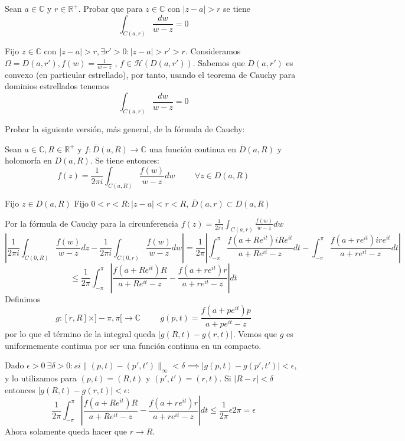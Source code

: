 
\begin{ejer}
	Sean $a\in\mathbb{C}$ y $r\in\mathbb{R}^+$. Probar que para $z\in\mathbb{C}$ con $|z-a|>r$ se tiene
	$$ \int_{C(a,r)} \frac{dw}{w-z} = 0 $$
\end{ejer}
\begin{sol}
Fijo $z\in\mathbb{C}$ con $|z-a|>r, \exists r'>0 : |z-a|>r'>r$.
Consideramos $\Omega = D(a,r'), f(w) = \frac{1}{w-z}$ , $f\in\mathcal{H}(D(a,r'))$. Sabemos que $D(a,r')$ es convexo (en particular estrellado), por tanto, usando el teorema de Cauchy para dominios estrellados tenemos %
$$\int_{C(a,r)} \frac{dw}{w-z} = 0$$
\end{sol}


\begin{ejer}
	Probar la siguiente versión, más general, de la fórmula de Cauchy:
	
	Sean $a\in\mathbb{C},R\in\mathbb{R}^+$ y $f:\overline{D}(a,R) \rightarrow \mathbb{C}$ una función continua en $\overline{D}(a,R)$ y holomorfa en $D(a,R)$. Se tiene entonces:
	$$ f(z) = \frac{1}{2\pi i} \int_{C(a,R)} \frac{f(w)}{w-z}dw \hspace{1cm} \forall z\in D(a,R) $$
\end{ejer}

\begin{sol}

Fijo $z\in D(a,R)$
Fijo $0<r<R : |z-a|<r<R$, $\overline{D}(a,r) \subset D(a,R)$

Por la fórmula de Cauchy para la circunferencia $f(z) = \frac{1}{2\pi i} \int_{C(a,r)} \frac{f(w)}{w-z} dw$
$$ \left|\frac{1}{2\pi i} \int_{C(0,R)} \frac{f(w)}{w-z} dz - \frac{1}{2\pi i} \int_{C(0,r)} \frac{f(w)}{w-z}dw \right| = \frac{1}{2\pi} \left|\int_{-\pi}^{\pi} \frac{f(a+Re^{it}) iRe^{it} }{ a+Re^{it}-z } dt - \int_{-\pi}^{\pi} \frac{f(a+re^{it}) ire^{it}}{a+re^{it}-z} dt\right|$$
$$\leq \frac{1}{2\pi} \int_{-\pi}^{\pi} \left| \frac{f(a+Re^{it})R}{a+Re^{it}-z} -\frac{f(a+re^{it})r}{a+re^{it}-z} \right| dt$$
Definimos
$$g:[r,R]\times]-\pi, \pi[ \rightarrow \mathbb{C} \hspace{1cm}
g(p,t) = \frac{f(a+pe^{it})p}{a+pe^{it}-z}$$
por lo que el término de la integral queda $|g(R,t)-g(r,t)|$. Vemos que $g$ es uniformemente continua por ser una función continua en un compacto.

Dado $\epsilon >0 \ \exists \delta>0 : si \| (p,t)-(p',t') \| _{\infty}<\delta \implies |g(p,t)-g(p',t')| < \epsilon$,
y lo utilizamos para $(p,t)=(R,t)$ y $(p',t')=(r,t)$. Si $|R-r|<\delta$ entonces $|g(R,t)-g(r,t)| < \epsilon$:
$$\frac{1}{2\pi} \int_{-\pi}^{\pi} \left| \frac{f(a+Re^{it})R}{a+Re^{it}-z} -\frac{f(a+re^{it})r}{a+re^{it}-z} \right| dt \leq \frac{1}{2\pi}\epsilon 2\pi = \epsilon$$
Ahora solamente queda hacer que $r\rightarrow R$.

\end{sol}


